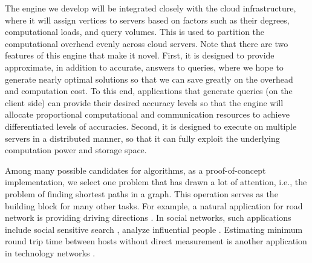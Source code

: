 The engine we develop will be integrated closely with the cloud infrastructure, where it will assign vertices to servers based on factors such as their degrees, computational loads, and query volumes. This is used to partition the computational overhead evenly across cloud servers. Note that there are two features of this engine that make it novel. First, it is designed to provide approximate, in addition to accurate, answers to queries, where  we hope to generate nearly optimal solutions so that we can save greatly on the overhead and computation cost. To this end, applications that generate queries (on the client side) can
provide their desired accuracy levels so that the engine will allocate proportional computational and communication resources to achieve differentiated levels of accuracies. Second, it is designed to execute on multiple servers in a distributed manner, so that it can fully exploit the underlying computation power and storage space.

Among many possible candidates for algorithms, as a proof-of-concept implementation, we select one problem that has drawn a lot of attention, i.e., the problem of finding shortest paths in a graph. This operation serves as the building block for many other tasks. For example, a natural application for road network is providing driving directions \cite{Abraham:2011:HLA:2008623.2008645}. In social networks, such applications include social sensitive search \cite{Vieira:2007:ESR:1321440.1321520}, analyze influential people \cite{Kempe:2003:MSI:956750.956769}. Estimating minimum round trip time between hosts without direct measurement is another application in technology networks \cite{Tang:2003:VLI:948205.948223}.



